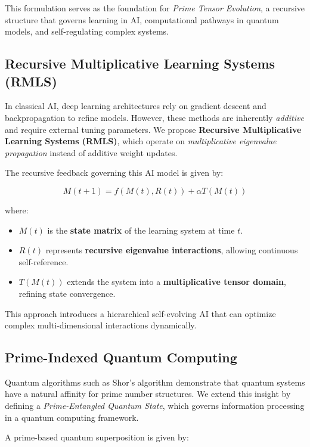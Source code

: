\documentclass{article}
\theoremstyle{plain}
\theoremstyle{plain}
\theoremstyle{definition}
\theoremstyle{remark}
\begin{document}
This formulation serves as the foundation for \textit{Prime Tensor Evolution}, a recursive structure that governs learning in AI, computational pathways in quantum models, and self-regulating complex systems.

\subsection{Recursive Multiplicative Learning Systems (RMLS)}

In classical AI, deep learning architectures rely on gradient descent and backpropagation to refine models. However, these methods are inherently \textit{additive} and require external tuning parameters. We propose \textbf{Recursive Multiplicative Learning Systems (RMLS)}, which operate on \textit{multiplicative eigenvalue propagation} instead of additive weight updates.

The recursive feedback governing this AI model is given by:

\begin{equation}
M(t+1) = f(M(t), R(t)) + \alpha T(M(t))
\end{equation}

where:
\begin{itemize}
    \item $M(t)$ is the \textbf{state matrix} of the learning system at time $t$.
    \item $R(t)$ represents \textbf{recursive eigenvalue interactions}, allowing continuous self-reference.
    \item $T(M(t))$ extends the system into a \textbf{multiplicative tensor domain}, refining state convergence.
\end{itemize}

This approach introduces a hierarchical self-evolving AI that can optimize complex multi-dimensional interactions dynamically.

\subsection{Prime-Indexed Quantum Computing}

Quantum algorithms such as Shor’s algorithm demonstrate that quantum systems have a natural affinity for prime number structures. We extend this insight by defining a \textit{Prime-Entangled Quantum State}, which governs information processing in a quantum computing framework.

A prime-based quantum superposition is given by:
\end{document}
